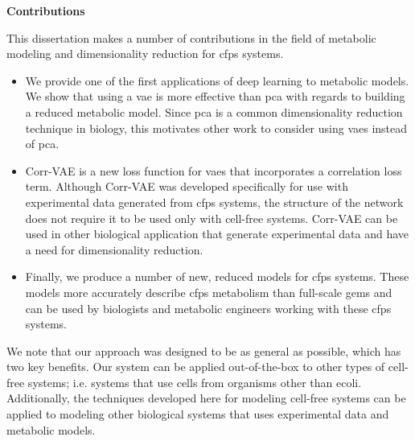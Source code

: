 \textbf{Contributions}

This dissertation makes a number of contributions in the field of metabolic modeling and dimensionality reduction for \gls{cfps} systems.
\begin{itemize}
\item We provide one of the first applications of deep learning to metabolic models.
We show that using a \gls{vae} is more effective than \gls{pca} with regards to building a reduced metabolic model.
Since \gls{pca} is a common dimensionality reduction technique in biology, this motivates other work to consider using \glspl{vae} instead of \gls{pca}.
\item Corr-VAE is a new loss function for \glspl{vae} that incorporates a correlation loss term.
Although Corr-VAE was developed specifically for use with experimental data generated from \gls{cfps} systems, the structure of the network does not require it to be used only with cell-free systems.
Corr-VAE can be used in other biological application that generate experimental data and have a need for dimensionality reduction.
\item Finally, we produce a number of new, reduced models for \gls{cfps} systems.
These models more accurately describe \gls{cfps} metabolism than full-scale \glspl{gem} and can be used by biologists and metabolic engineers working with these \gls{cfps} systems.
\end{itemize}
We note that our approach was designed to be as general as possible, which has two key benefits.
Our system can be applied out-of-the-box to other types of cell-free systems; i.e. systems that use cells from organisms other than \gls{ecoli}.
Additionally, the techniques developed here for modeling cell-free systems can be applied to modeling other biological systems that uses experimental data and metabolic models.

